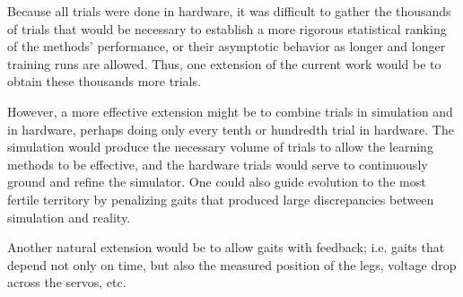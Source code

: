 
Because all trials were done in hardware, it was difficult to gather
the thousands of trials that would be necessary to establish a more
rigorous statistical ranking of the methods' performance, or their
asymptotic behavior as longer and longer training runs are allowed.
Thus, one extension of the current work would be to obtain these
thousands more trials.

However, a more effective extension might be to combine trials in
simulation and in hardware, perhaps doing only every tenth or
hundredth trial in hardware.  The simulation would produce the
necessary volume of trials to allow the learning methods to be
effective, and the hardware trials would serve to continuously ground
and refine the simulator.  One could also guide evolution to the most
fertile territory by penalizing gaits that produced large
discrepancies between simulation and reality.

Another natural extension would be to allow gaits with feedback;
i.e. gaits that depend not only on time, but also the measured
position of the legs, voltage drop across the servos, etc.

